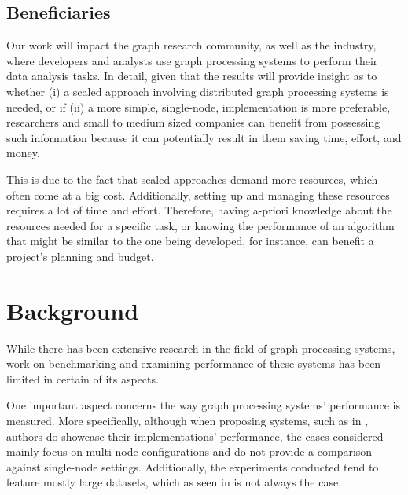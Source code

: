 \documentclass[a4paper,11pt]{article}
\begin{document}

\subsection{Beneficiaries}

\par Our work will impact the graph research community, as well as the industry, where developers and analysts use graph processing systems to perform their data analysis tasks. In detail, given that the results will provide insight as to whether (i) a scaled approach involving distributed graph processing systems is needed, or if (ii) a more simple, single-node, implementation is more preferable, researchers and small to medium sized companies can benefit from possessing such information because it can potentially result in them saving time, effort, and money.

\par This is due to the fact that scaled approaches demand more resources, which often come at a big cost. Additionally, setting up and managing these resources requires a lot of time and effort. Therefore, having a-priori knowledge about the resources needed for a specific task, or knowing the performance of an algorithm that might be similar to the one being developed, for instance, can benefit a project's planning and budget.





\section{Background} \label{background}

\par While there has been extensive research in the field of graph processing systems, work on benchmarking and examining performance of these systems has been limited in certain of its aspects. 

\par One important aspect concerns the way graph processing systems' performance is measured. More specifically, although when proposing systems, such as in \cite{pregel,graphxpaper, powergraph}, authors do showcase their implementations' performance, the cases considered mainly focus on multi-node configurations and do not provide a comparison against single-node settings. Additionally, the experiments conducted tend to feature mostly large datasets, which as seen in \cite{survey} is not always the case.
\end{document}

